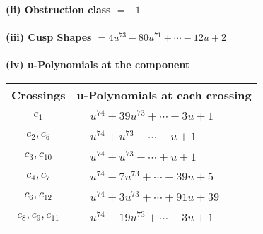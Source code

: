 \documentclass[1p]{elsarticle_modified}
\theoremstyle{definition}
\begin{document}
\flushleft \textbf{(ii) Obstruction class $= -1$}\\~\\
\flushleft \textbf{(iii) Cusp Shapes $= 4 u^{73}-80 u^{71}+\cdots-12 u+2$}\\~\\
\newpage\renewcommand{\arraystretch}{1}
\flushleft \textbf{(iv) u-Polynomials at the component}\newline \\
\begin{tabular}{m{50pt}|m{274pt}}
Crossings & \hspace{64pt}u-Polynomials at each crossing \\
\hline $$\begin{aligned}c_{1}\end{aligned}$$&$\begin{aligned}
&u^{74}+39 u^{73}+\cdots+3 u+1
\end{aligned}$\\
\hline $$\begin{aligned}c_{2},c_{5}\end{aligned}$$&$\begin{aligned}
&u^{74}+u^{73}+\cdots- u+1
\end{aligned}$\\
\hline $$\begin{aligned}c_{3},c_{10}\end{aligned}$$&$\begin{aligned}
&u^{74}+u^{73}+\cdots+u+1
\end{aligned}$\\
\hline $$\begin{aligned}c_{4},c_{7}\end{aligned}$$&$\begin{aligned}
&u^{74}-7 u^{73}+\cdots-39 u+5
\end{aligned}$\\
\hline $$\begin{aligned}c_{6},c_{12}\end{aligned}$$&$\begin{aligned}
&u^{74}+3 u^{73}+\cdots+91 u+39
\end{aligned}$\\
\hline $$\begin{aligned}c_{8},c_{9},c_{11}\end{aligned}$$&$\begin{aligned}
&u^{74}-19 u^{73}+\cdots-3 u+1
\end{aligned}$\\
\hline
\end{tabular}\\~\\
\end{document}
